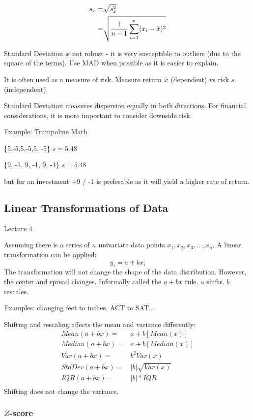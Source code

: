 \documentclass[11pt, oneside]{article}   	%
\newcommand{\overbar}[1]{\mkern 1.5mu\overline{\mkern-1.5mu#1\mkern-1.5mu}\mkern 1.5mu}
\begin{document}
\begin{align*}
s_x =& \sqrt{s^2_x} \\
      =& \sqrt{\frac{1}{n-1} \sum\limits_{i=1}^n (x_i - \overbar{x})^2}
\end{align*}

Standard Deviation is not robust - it is very susceptible to outliers (due to the square of the terms). Use MAD when possible as it is easier to explain.

It is often used as a measure of risk. Measure return $\overbar{x}$ (dependent) vs risk $s$ (independent).

Standard Deviation measures dispersion equally in both directions. For financial considerations, it is more important to consider downside risk.

Example: Trampoline Math

\{5,-5,5,-5,5, -5\} $s = 5.48$

\{9, -1, 9, -1, 9, -1\} $s = 5.48$

but for an investment +9 / -1 is preferable as it will yield a higher rate of return.

\subsection{Linear Transformations of Data}

Lecture 4

Assuming there is a series of $n$ univariate data points $x_1, x_2, x_3, ..., x_n$. A linear transformation can be applied:
\[
y_i = a + b x_i
\]
The transformation will not change the shape of the data distribution. However, the center and spread changes. Informally called the $a + bx$ rule. $a$ shifts. $b$ rescales.

Examples: changing feet to inches, ACT to SAT...

Shifting and rescaling affects the mean and variance differently:
\begin{align*}
Mean(a + bx) =& a + b[Mean(x)] \\
Median(a + bx) =& a + b[Median(x)]\\
Var(a + bx) =& b^2 Var(x) \\
StdDev(a + bx) =& |b|\sqrt{Var(x)} \\
IQR(a + bx) =& |b| * IQR \\
\end{align*}
Shifting does not change the variance. 

\subsubsection{$Z$-score}
\end{document}
